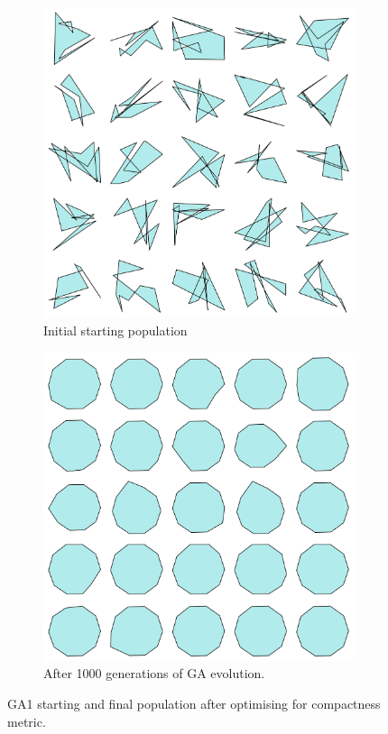 \documentclass{article}
\begin{document}
\begin{figure}[H]
    \centering
    \begin{subfigure}[b]{0.45\textwidth}
        \centering
        \includegraphics[width=\textwidth]{figures/GAResults/GA1/10point_initial_pop.png}
        \caption{Initial starting population}
        \label{fig:GA1_starting}
    \end{subfigure}
    \hfill
    \begin{subfigure}[b]{0.45\textwidth}
        \centering
        \includegraphics[width=\textwidth]{figures/GAResults/GA1/final_population.png}
        \caption{After 1000 generations of GA evolution.}
        \label{fig:GA1_final}
    \end{subfigure}
    \caption{GA1 starting and final population after optimising for compactness metric.}
    \label{fig:GA1_before_after_GA}
\end{figure}
\end{document}
